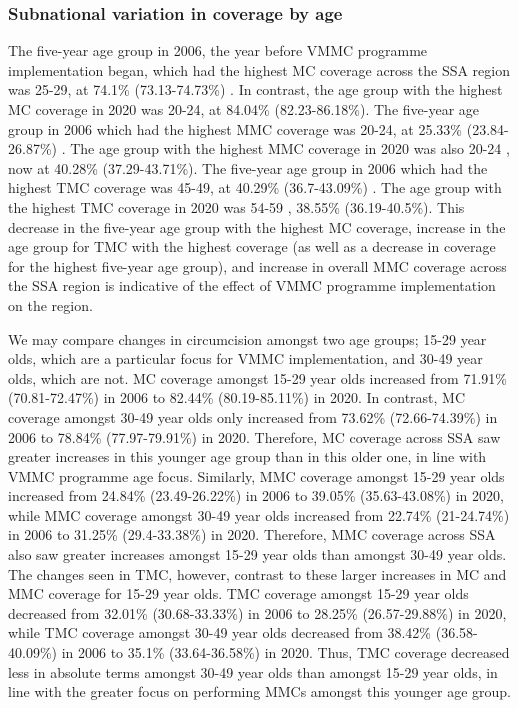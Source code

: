 \documentclass{article}
\begin{document}

\subsubsection*{Subnational variation in coverage by age}


The five-year age group in 2006, the year before VMMC programme implementation began, which had the highest MC coverage across the SSA region was 25-29, at 74.1\% (73.13-74.73\%) . In contrast, the age group with the highest MC coverage in 2020 was 20-24, at 84.04\% (82.23-86.18\%). The five-year age group in 2006 which had the highest MMC coverage was 20-24, at 25.33\% (23.84-26.87\%) . The age group with the highest MMC coverage in 2020 was also 20-24 , now at 40.28\% (37.29-43.71\%). The five-year age group in 2006 which had the highest TMC coverage was 45-49, at 40.29\% (36.7-43.09\%) . The age group with the highest TMC coverage in 2020 was 54-59 , 38.55\% (36.19-40.5\%). This decrease in the five-year age group with the highest MC coverage, increase in the age group for TMC with the highest coverage (as well as a decrease in coverage for the highest five-year age group), and increase in overall MMC coverage across the SSA region is indicative of the effect of VMMC programme implementation on the region.

We may compare changes in circumcision amongst two age groups; 15-29 year olds, which are a particular focus for VMMC implementation, and 30-49 year olds, which are not. MC coverage amongst 15-29 year olds increased from 71.91\% (70.81-72.47\%) in 2006 to 82.44\% (80.19-85.11\%) in 2020. In contrast, MC coverage amongst 30-49 year olds only increased from 73.62\% (72.66-74.39\%) in 2006 to 78.84\% (77.97-79.91\%) in 2020. Therefore, MC coverage across SSA saw greater increases in this younger age group than in this older one, in line with VMMC programme age focus. Similarly, MMC coverage amongst 15-29 year olds increased from 24.84\% (23.49-26.22\%) in 2006 to 39.05\% (35.63-43.08\%) in 2020, while MMC coverage amongst 30-49 year olds increased from 22.74\% (21-24.74\%) in 2006 to 31.25\% (29.4-33.38\%) in 2020. Therefore, MMC coverage across SSA also saw greater increases amongst 15-29 year olds than amongst 30-49 year olds. The changes seen in TMC, however, contrast to these larger increases in MC and MMC coverage for 15-29 year olds. TMC coverage amongst 15-29 year olds decreased from 32.01\% (30.68-33.33\%) in 2006 to 28.25\% (26.57-29.88\%) in 2020, while TMC coverage amongst 30-49 year olds decreased from 38.42\% (36.58-40.09\%) in 2006 to 35.1\% (33.64-36.58\%) in 2020. Thus, TMC coverage decreased less in absolute terms amongst 30-49 year olds than amongst 15-29 year olds, in line with the greater focus on performing MMCs amongst this younger age group.
\end{document}

